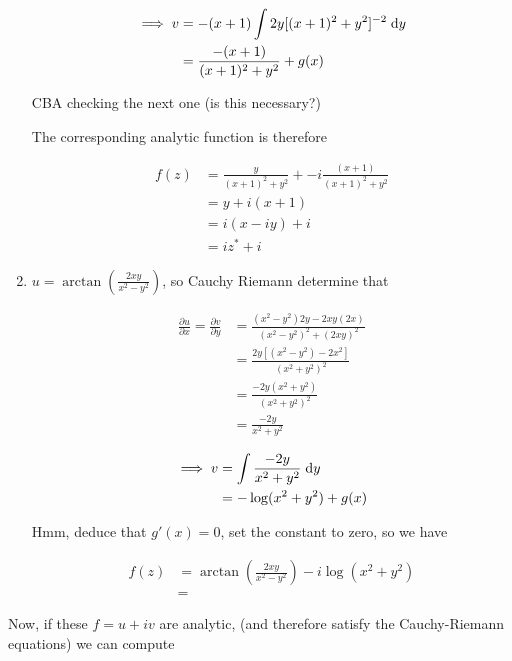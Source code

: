 \documentclass[a4paper]{article}
\begin{document}
\begin{enumerate}
	\begin{align*}
	\implies v & = -(x+1)\int 2y [(x+1)^{2} + y^{2}]^{-2} \; \mathrm{d} y   \\
	& = \frac{-(x+1)}{(x+1)^{2} + y^{2}} + g(x)
	\end{align*}
	
	CBA checking the next one (is this necessary?)
	
	The corresponding analytic function is therefore
	
	\begin{align*}
	f(z) & = \frac{y}{(x+1)^{2} + y^{2}}  + - i \frac{(x+1)}{(x+1)^{2} + y^{2}} \\
	& = y + i(x+1) \\
	& = i(x - iy) + i \\
	& = i z^{*} + i
	\end{align*}
	
	\item $ u = \arctan\left(   \frac{2xy}{x^{2} - y^{2}} \right)   $, so Cauchy Riemann determine that
	
	
	
	\begin{align*}
	\frac{\partial u }{\partial x} = \frac{\partial v }{\partial y} & = \frac{(x^{2} - y^{2})2y - 2xy(2x)}{(x^{2} - y^{2})^{2} + (2xy)^{2}  }   \\
	& = \frac{2y[(x^{2} - y^{2}) - 2x^{2}]}{(x^{2} + y^{2})^{2} } \\
	& = \frac{-2y(x^{2} + y^{2})}{(x^{2} + y^{2})^{2} } \\
	& = \frac{-2y}{x^{2} + y^{2} }
	\end{align*}
	
	\begin{align*}
	\implies v & = \int \frac{-2y}{x^{2} + y^{2} }\; \mathrm{d} y \\
	& = - \log ( x^{2} + y^{2} ) + g(x) \\	
	\end{align*}
	
	Hmm, deduce that $ g'(x) = 0 $, set the constant to zero, so we have 
	
	\begin{align*}
	f(z) & = \arctan\left(   \frac{2xy}{x^{2} - y^{2}} \right)  - i \log ( x^{2} + y^{2} ) \\
	& = 
	\end{align*}
		
	
\end{enumerate}


Now, if these $ f = u + iv $ are analytic, (and therefore satisfy the Cauchy-Riemann equations) we can compute
\end{document}
